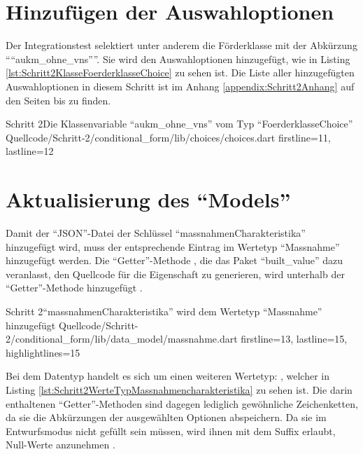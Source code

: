 \clearpage
\section{Hinzufügen der Auswahloptionen}

Der Integrationstest selektiert unter anderem die Förderklasse mit der Abkürzung \enquote{``aukm\allowbreak_ohne\allowbreak_vns''}. Sie wird den Auswahloptionen hinzugefügt, wie in Listing \ref{lst:Schritt2KlasseFoerderklasseChoice} zu sehen ist.
Die Liste aller hinzugefügten Auswahloptionen in diesem Schritt ist im Anhang \ref{appendix:Schritt2Anhang} auf den Seiten \pageref{lst:Schritt2FoerderklasseChoices} bis \pageref{lst:Schritt2hauptzielsetzungLandChoices} zu finden.

\begin{alexlisting}{Schritt 2}{Die Klassenvariable \enquote{aukm_ohne_vns} vom Typ \enquote{FoerderklasseChoice}}
  {Quellcode/Schritt-2/conditional_form/lib/choices/choices.dart}
  {firstline=11, lastline=12}
  \label{lst:Schritt2KlasseFoerderklasseChoice}
\end{alexlisting}

\section{Aktualisierung des \enquote{Models}}

Damit der \enquote{JSON}-Datei der Schlüssel \enquote{massnahmenCharakteristika} hinzugefügt wird, muss der entsprechende Eintrag im Wertetyp \enquote{Massnahme} hinzugefügt werden.
Die \enquote{Getter}-Metho\-de , die das Paket \enquote{built_value} dazu veranlasst,
den Quellcode für die Eigenschaft zu generieren, wird unterhalb der \enquote{Getter}-Methode  hinzugefügt .

\begin{alexlisting}{Schritt 2}{\enquote{massnahmenCharakteristika} wird dem Wertetyp \enquote{Massnahme} hinzugefügt}
  {Quellcode/Schritt-2/conditional_form/lib/data_model/massnahme.dart}
  {firstline=13, lastline=15, highlightlines={15}}
  \label{lst:Schritt2massnahmenCharakteristikaWirdMMassnahmeHinzugefuegt}
\end{alexlisting}

Bei dem Datentyp handelt es sich um einen weiteren Wertetyp: , welcher in Listing \ref{lst:Schritt2WerteTypMassnahmencharakteristika} zu sehen ist.
Die darin enthaltenen \enquote{Getter}-Methoden sind dagegen lediglich gewöhnliche Zeichenketten, da sie die Abkürzungen der ausgewählten Optionen abspeichern.
Da sie im Entwurfsmodus nicht gefüllt sein müssen, wird ihnen mit dem Suffix  erlaubt, Null-Werte anzunehmen . 

